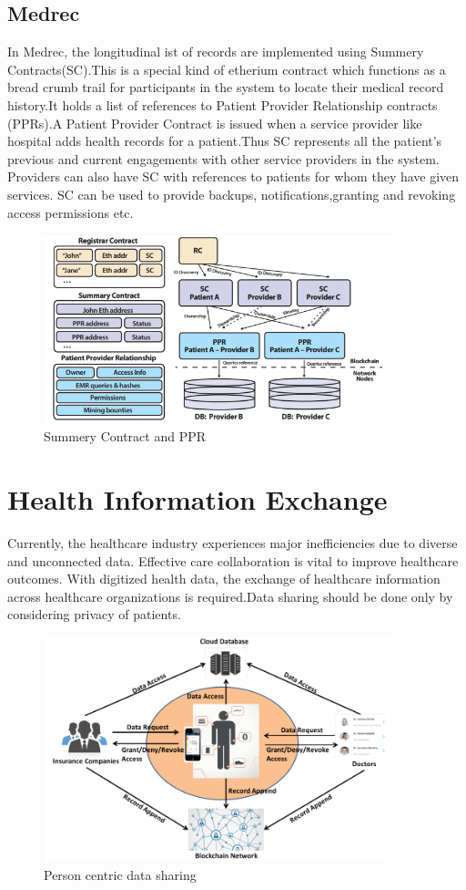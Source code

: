 \documentclass[12pt]{report}
\begin{document}
\subsection{Medrec\cite{2}}
In Medrec, the longitudinal ist of records are implemented using Summery Contracts(SC).This is a special kind of etherium contract which functions as a bread crumb trail for participants in the system to locate their medical record history.It holds a list of references to Patient Provider Relationship contracts (PPRs).A Patient Provider Contract is issued when a service provider like hospital adds health records for a patient.Thus SC represents all the patient's previous and current engagements with other service providers in the system. Providers can also have SC with references to patients for whom they have given services. SC can be used to provide backups, notifications,granting and revoking access permissions etc.
\begin{figure}[H]
\centering
\includegraphics[width=0.9\textwidth]{ppr.png}
\caption{Summery Contract and PPR}
\label{ppr}
\end{figure}
\section{Health Information Exchange}
Currently, the healthcare industry experiences major inefficiencies due to diverse and unconnected data. Effective care collaboration is vital to improve healthcare outcomes. With digitized health data, the exchange of healthcare information across healthcare organizations is required.Data sharing should be done only by considering privacy of patients.
\begin{figure}[H]
\centering
\includegraphics[width=0.9\textwidth]{centric.png}
\caption{Person centric data sharing\cite{13}}
\label{centric}
\end{figure}
\end{document}
